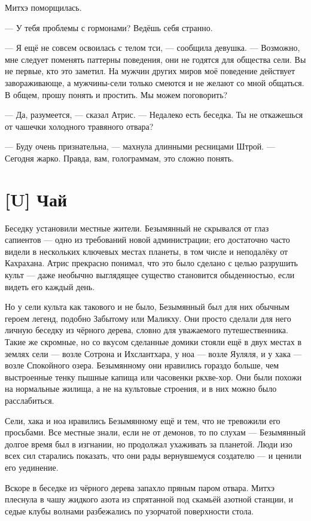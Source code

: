 Митхэ поморщилась.

--- У тебя проблемы с гормонами?
Ведёшь себя странно.

--- Я ещё не совсем освоилась с телом тси, --- сообщила девушка.
--- Возможно, мне следует поменять паттерны поведения, они не годятся для общества сели.
Вы не первые, кто это заметил.
На мужчин других миров моё поведение действует завораживающе, а мужчины-сели только смеются и не желают со мной общаться.
В общем, прошу понять и простить.
Мы можем поговорить?

--- Да, разумеется, --- сказал Атрис.
--- Недалеко есть беседка.
Ты не откажешься от чашечки холодного травяного отвара?

--- Буду очень признательна, --- махнула длинными ресницами Штрой.
--- Сегодня жарко.
Правда, вам, голограммам, это сложно понять.

\section{[U] Чай}

Беседку установили местные жители.
Безымянный не скрывался от глаз сапиентов --- одно из требований новой администрации;
его достаточно часто видели в нескольких ключевых местах планеты, в том числе и неподалёку от Кахрахана.
Атрис прекрасно понимал, что это было сделано с целью разрушить культ --- даже необычно выглядящее существо становится обыденностью, если видеть его каждый день.

Но у сели культа как такового и не было, Безымянный был для них обычным героем легенд, подобно Забытому или Маликху.
Они просто сделали для него личную беседку из чёрного дерева, словно для уважаемого путешественника.
Такие же скромные, но со вкусом сделанные домики стояли ещё в двух местах в землях сели --- возле Сотрона и Ихслантхара, у ноа --- возле Яуляля, и у хака --- возле Спокойного озера.
Безымянному они нравились гораздо больше, чем выстроенные тенку пышные капища или часовенки ркхве-хор.
Они были похожи на нормальные жилища, а не на культовые строения, и в них можно было расслабиться.

Сели, хака и ноа нравились Безымянному ещё и тем, что не тревожили его просьбами.
Все местные знали, если не от демонов, то по слухам --- Безымянный долгое время был в изгнании, но продолжал ухаживать за планетой.
Люди изо всех сил старались показать, что они рады вернувшемуся создателю --- и ценили его уединение.

Вскоре в беседке из чёрного дерева запахло пряным паром отвара.
Митхэ плеснула в чашу жидкого азота из спрятанной под скамьёй азотной станции, и седые клубы волнами разбежались по узорчатой поверхности стола.

